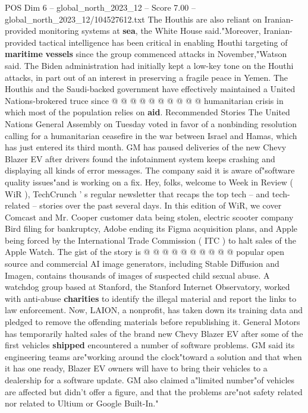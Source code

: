 \begin{textsample}{POS Dim 6 – global\_north\_2023\_12 – Score 7.00 – global\_north\_2023\_12/104527612.txt}
The Houthis are also reliant on Iranian-provided monitoring systems at \textbf{sea}, the White House said."Moreover, Iranian-provided tactical intelligence has been critical in enabling Houthi targeting of \textbf{maritime} \textbf{vessels} since the group commenced attacks in November,"Watson said.
The Biden administration had initially kept a low-key tone on the Houthi attacks, in part out of an interest in preserving a fragile peace in Yemen.
The Houthis and the Saudi-backed government have effectively maintained a United Nations-brokered truce since @ @ @ @ @ @ @ @ @ @ humanitarian crisis in which most of the population relies on \textbf{aid}.
Recommended Stories The United Nations General Assembly on Tuesday voted in favor of a nonbinding resolution calling for a humanitarian ceasefire in the war between Israel and Hamas, which has just entered its third month.
GM has paused deliveries of the new Chevy Blazer EV after drivers found the infotainment system keeps crashing and displaying all kinds of error messages.
The company said it is aware of"software quality issues"and is working on a fix.
Hey, folks, welcome to Week in Review ( WiR ), TechCrunch ' s regular newsletter that recaps the top tech -- and tech-related -- stories over the past several days.
In this edition of WiR, we cover Comcast and Mr.
Cooper customer data being stolen, electric scooter company Bird filing for bankruptcy, Adobe ending its Figma acquisition plans, and Apple being forced by the International Trade Commission ( ITC ) to halt sales of the Apple Watch.
The gist of the story is @ @ @ @ @ @ @ @ @ @ popular open source and commercial AI image generators, including Stable Diffusion and Imagen, contains thousands of images of suspected child sexual abuse.
A watchdog group based at Stanford, the Stanford Internet Observatory, worked with anti-abuse \textbf{charities} to identify the illegal material and report the links to law enforcement.
Now, LAION, a nonprofit, has taken down its training data and pledged to remove the offending materials before republishing it.
General Motors has temporarily halted sales of the brand new Chevy Blazer EV after some of the first vehicles \textbf{shipped} encountered a number of software problems.
GM said its engineering teams are"working around the clock"toward a solution and that when it has one ready, Blazer EV owners will have to bring their vehicles to a dealership for a software update.
GM also claimed a"limited number"of vehicles are affected but didn't offer a figure, and that the problems are"not safety related nor related to Ultium or Google Built-In."

\end{textsample}
